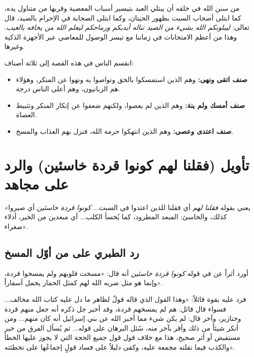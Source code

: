 \begin{fawaid}
من سنن الله في خلقه أن يبتلي العبد بتيسير أسباب المعصية وقربها من متناول يده، كما ابتلى أصحاب السبت بظهور الحيتان، وكما ابتلى الصحابة في الإحرام بالصيد، قال تعالى: \textit{ليبلونكم الله بشيء من الصيد تناله أيديكم ورماحكم ليعلم الله من يخافه بالغيب}. وهذا من أعظم الامتحانات في زماننا مع تيسر الوصول للمعاصي عبر الأجهزة الذكية وغيرها.
\end{fawaid}

\begin{fawaid}
انقسم الناس في هذه القصة إلى ثلاثة أصناف:
\begin{itemize}
    \item \textbf{صنف اتقى ونهى:} وهم الذين استمسكوا بالحق وتواصوا به ونهوا عن المنكر، وهؤلاء هم الربانيون، وهم أعلى الناس درجة.
    \item \textbf{صنف أمسك ولم ينهَ:} وهم الذين لم يعصوا، ولكنهم ضعفوا عن إنكار المنكر وتثبيط العصاة.
    \item \textbf{صنف اعتدى وعصى:} وهم الذين انتهكوا حرمة الله، فنزل بهم العذاب والمسخ.
\end{itemize}
\end{fawaid}

\separator

\section{تأويل (فقلنا لهم كونوا قردة خاسئين) والرد على مجاهد}
 «يعني بقوله \textit{فقلنا لهم} أي فقلنا للذين اعتدوا في السبت... \textit{كونوا قردة خاسئين} أي صيروا كذلك، والخاسئ: المبعد المطرود، كما يُخسأ الكلب... أي مبعدين من الخير، أذلاء صغراء».

\subsection{رد الطبري على من أوّل المسخ}
أورد  أثراً عن  في قوله \textit{كونوا قردة خاسئين} أنه قال: «مسخت قلوبهم ولم يمسخوا قردة، وإنما هو مثل ضربه الله لهم كمثل الحمار يحمل أسفاراً».

فرد عليه  بقوة قائلاً: «وهذا القول الذي قاله  قولٌ لظاهر ما دل عليه كتاب الله مخالف... فسواء قال قائل: هم لم يمسخهم قردة، وقد أخبر جل ذكره أنه جعل منهم قردة وخنازير، وآخر قال: لم يكن شيء مما أخبر الله عن بني إسرائيل أنه كان منهم... ومن أنكر شيئاً من ذلك وأقر بآخر منه، سُئل البرهان على قوله... ثم يُسأل الفرق من خبر مستفيض أو أثر صحيح، هذا مع خلاف قول  قول جميع الحجة التي لا يجوز عليها الخطأ والكذب فيما نقلته مجمعة عليه، وكفى دليلاً على فساد قولٍ إجماعُها على تخطئته».

